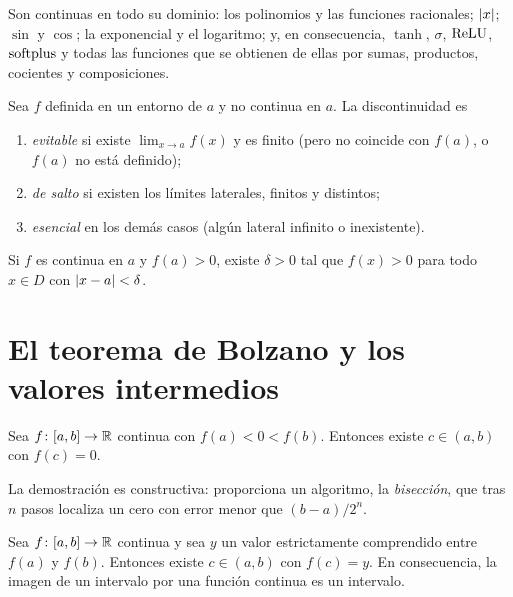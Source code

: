 \begin{proposicion}\label{prop:elementales-continuas}
Son continuas en todo su dominio: los polinomios y las funciones racionales; $\lvert x\rvert$; $\sin$ y $\cos$; la exponencial y el logaritmo; y, en consecuencia, $\tanh$, $\sigma$, $\operatorname{ReLU}$, $\operatorname{softplus}$ y todas las funciones que se obtienen de ellas por sumas, productos, cocientes y composiciones.
\end{proposicion}

\begin{definicion}\label{def:discontinuidades}
Sea $f$ definida en un entorno de $a$ y no continua en $a$. La discontinuidad es
\begin{enumerate}
  \item \emph{evitable} si existe $\lim_{x\to a}f(x)$ y es finito (pero no coincide con $f(a)$, o $f(a)$ no está definido);
  \item \emph{de salto} si existen los límites laterales, finitos y distintos;
  \item \emph{esencial} en los demás casos (algún lateral infinito o inexistente).
\end{enumerate}
\end{definicion}

\addtocounter{definicion}{1}%

\begin{proposicion}\label{prop:signo}
Si $f$ es continua en $a$ y $f(a)>0$, existe $\delta>0$ tal que $f(x)>0$ para todo $x\in D$ con $\lvert x-a\rvert<\delta$.
\end{proposicion}

\section{El teorema de Bolzano y los valores intermedios}

\begin{teorema}[Bolzano]\label{teo:bolzano}
Sea $f\colon[a,b]\to\mathbb{R}$ continua con $f(a)<0<f(b)$. Entonces existe $c\in(a,b)$ con $f(c)=0$.
\end{teorema}

La demostración es constructiva: proporciona un algoritmo, la \emph{bisección}, que tras $n$ pasos localiza un cero con error menor que $(b-a)/2^{n}$.

\begin{corolario}\label{cor:tvi}
Sea $f\colon[a,b]\to\mathbb{R}$ continua y sea $y$ un valor estrictamente comprendido entre $f(a)$ y $f(b)$. Entonces existe $c\in(a,b)$ con $f(c)=y$. En consecuencia, la imagen de un intervalo por una función continua es un intervalo.
\end{corolario}

